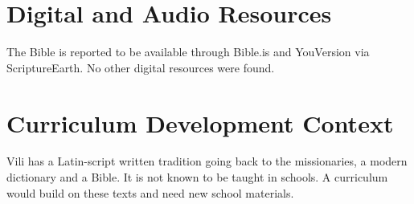 \documentclass[12pt]{article}
\begin{document}
\section{Digital and Audio Resources}
The Bible is reported to be available through Bible.is and YouVersion via ScriptureEarth. No other digital resources were found.

\section{Curriculum Development Context}
Vili has a Latin-script written tradition going back to the missionaries, a modern dictionary and a Bible. It is not known to be taught in schools. A curriculum would build on these texts and need new school materials.
\end{document}
